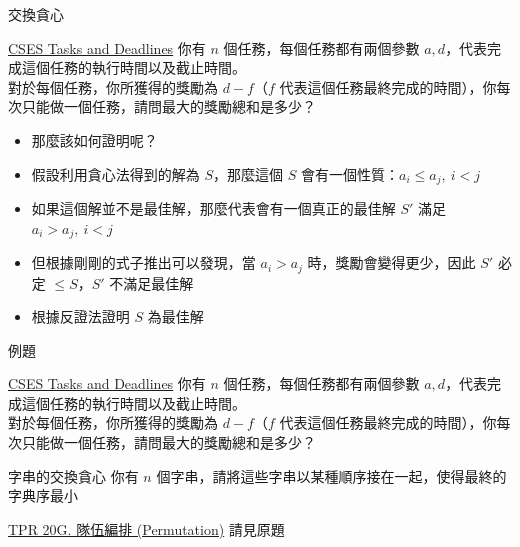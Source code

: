 \documentclass[aspectratio=169]{beamer}
\begin{document}
    \begin{frame}{交換貪心}
        \begin{block}{\href{https://cses.fi/problemset/task/1630/}{CSES Tasks and Deadlines}}
            你有 $n$ 個任務，每個任務都有兩個參數 $a, d$，代表完成這個任務的執行時間以及截止時間。\\
            對於每個任務，你所獲得的獎勵為 $d - f$（$f$ 代表這個任務最終完成的時間），你每次只能做一個任務，請問最大的獎勵總和是多少？
        \end{block}

        \begin{itemize}
            \item<1-> 那麼該如何證明呢？
            \item<2-> 假設利用貪心法得到的解為 $S$，那麼這個 $S$ 會有一個性質：$a_i \leq a_j,\ i < j$
            \item<3-> 如果這個解並不是最佳解，那麼代表會有一個真正的最佳解 $S'$ 滿足 $a_i > a_j,\ i < j$
            \item<4-> 但根據剛剛的式子推出可以發現，當 $a_i > a_j$ 時，獎勵會變得更少，因此 $S'$ 必定 $\le S$，$S'$ 不滿足最佳解
            \item<5-> 根據反證法證明 $S$ 為最佳解
        \end{itemize}
    \end{frame}

    \begin{frame}{例題}
        \begin{block}{\href{https://cses.fi/problemset/task/1630/}{CSES Tasks and Deadlines}}
            你有 $n$ 個任務，每個任務都有兩個參數 $a, d$，代表完成這個任務的執行時間以及截止時間。\\
            對於每個任務，你所獲得的獎勵為 $d - f$（$f$ 代表這個任務最終完成的時間），你每次只能做一個任務，請問最大的獎勵總和是多少？
        \end{block}

        \begin{block}{字串的交換貪心}
            你有 $n$ 個字串，請將這些字串以某種順序接在一起，使得最終的字典序最小
        \end{block}

        \begin{block}{\href{https://codeforces.com/group/H0qY3QmnOW/contest/377732/problem/G}{TPR 20G. 隊伍編排 (Permutation)}}
            請見原題
        \end{block}
    \end{frame}
\end{document}

